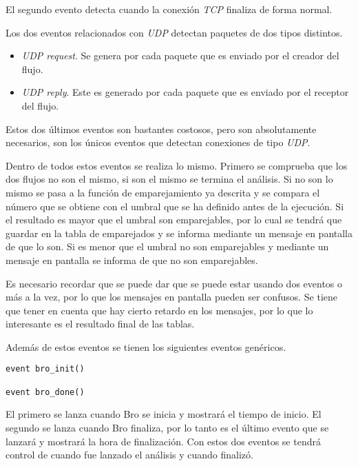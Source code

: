 \intro El segundo evento detecta cuando la conexión \textit{TCP} finaliza de forma normal.

\intro Los dos eventos relacionados con \textit{UDP} detectan paquetes de dos tipos distintos.

\begin{itemize}
\item \textit{UDP request}. Se genera por cada paquete que es enviado por el creador del flujo.
\item \textit{UDP reply}. Este es generado por cada paquete que es enviado por el receptor del flujo.
\end{itemize}

\intro Estos dos últimos eventos son bastantes costosos, pero son absolutamente necesarios, son los únicos 
eventos que detectan conexiones de tipo \textit{UDP}.

\intro Dentro de todos estos eventos se realiza lo mismo. Primero se comprueba que los dos flujos no son el mismo, 
si son el mismo se termina el análisis. Si no son lo mismo se pasa a la función de emparejamiento ya descrita y 
se compara el número que se obtiene con el umbral que se ha definido antes de la ejecución. Si el resultado es 
mayor que el umbral son emparejables, por lo cual se tendrá que guardar en la tabla de emparejados y se informa 
mediante un mensaje en pantalla de que lo son. Si es menor que el umbral no son emparejables y mediante un mensaje 
en pantalla se informa de que no son emparejables.

\intro Es necesario recordar que se puede dar que se puede estar usando dos eventos o más a la vez, por lo que los 
mensajes en pantalla pueden ser confusos. Se tiene que tener en cuenta que hay cierto retardo en los mensajes, por 
lo que lo interesante es el resultado final de las tablas.

\intro Además de estos eventos se tienen los siguientes eventos genéricos.

\begin{lstlisting}[style=CodigoC]
event bro_init()

event bro_done()
\end{lstlisting}

\intro El primero se lanza cuando Bro se inicia y mostrará el tiempo de inicio. El segundo se lanza cuando 
Bro finaliza, por lo tanto es el último evento que se lanzará y mostrará la hora de finalización. Con estos 
dos eventos se tendrá control de cuando fue lanzado el análisis y cuando finalizó.